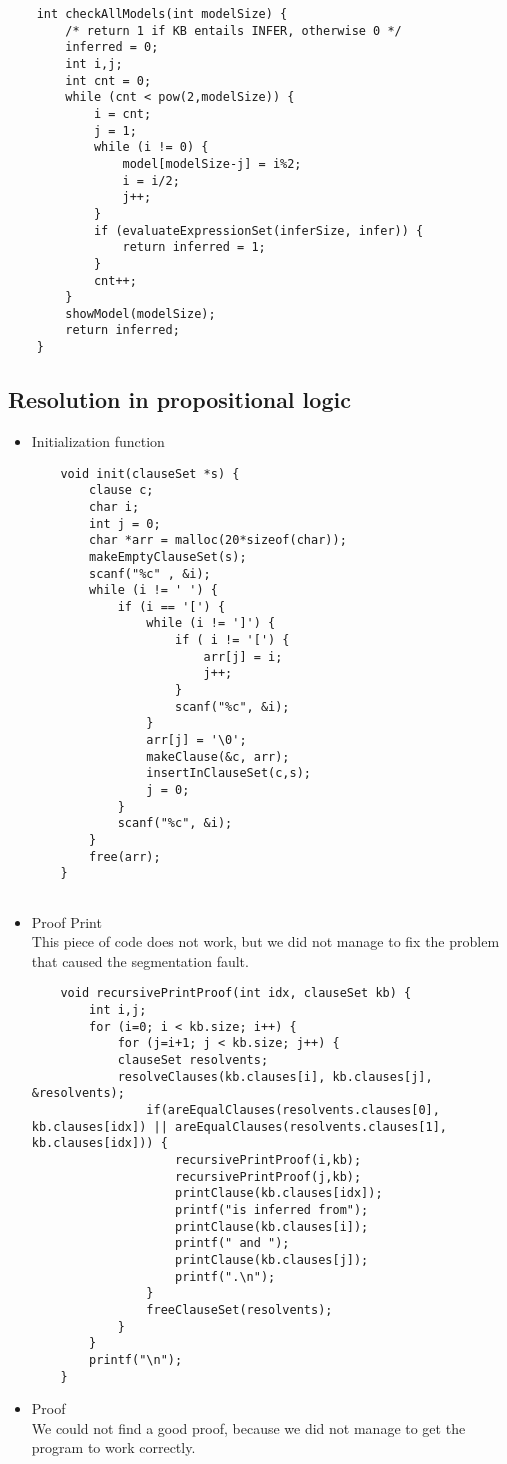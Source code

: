 \documentclass{article}
\begin{document}
	\begin{lstlisting}
	int checkAllModels(int modelSize) {
		/* return 1 if KB entails INFER, otherwise 0 */
		inferred = 0;
		int i,j;
		int cnt = 0;
		while (cnt < pow(2,modelSize)) {
			i = cnt;
			j = 1;
			while (i != 0) {
				model[modelSize-j] = i%2;
				i = i/2;
				j++;
			}
			if (evaluateExpressionSet(inferSize, infer)) {
				return inferred = 1;
			}
			cnt++;
		}
		showModel(modelSize);
		return inferred;
	}
	\end{lstlisting}
	
	
	\subsection*{Resolution in propositional logic}
	\begin{itemize}
	\item Initialization function
	\begin{lstlisting}
	void init(clauseSet *s) {
		clause c;
		char i;
		int j = 0;
		char *arr = malloc(20*sizeof(char));
		makeEmptyClauseSet(s);
		scanf("%c" , &i);
		while (i != ' ') {
			if (i == '[') {
				while (i != ']') {
					if ( i != '[') {
						arr[j] = i;
						j++;
					}
					scanf("%c", &i);
				}
				arr[j] = '\0';
				makeClause(&c, arr);
				insertInClauseSet(c,s);
				j = 0;
			}
			scanf("%c", &i);
		}
		free(arr);
	}
		
	\end{lstlisting}
	
	\item Proof Print\\
	This piece of code does not work, but we did not manage to fix the problem that caused the segmentation fault.
	\begin{lstlisting}
	void recursivePrintProof(int idx, clauseSet kb) {
		int i,j;
		for (i=0; i < kb.size; i++) {
			for (j=i+1; j < kb.size; j++) {
			clauseSet resolvents;
			resolveClauses(kb.clauses[i], kb.clauses[j], &resolvents);
				if(areEqualClauses(resolvents.clauses[0], kb.clauses[idx]) || areEqualClauses(resolvents.clauses[1], kb.clauses[idx])) {
					recursivePrintProof(i,kb);
					recursivePrintProof(j,kb);
					printClause(kb.clauses[idx]);
					printf("is inferred from");
					printClause(kb.clauses[i]);
					printf(" and ");
					printClause(kb.clauses[j]);
					printf(".\n");
				}
				freeClauseSet(resolvents);
			}
		}
		printf("\n");
	}
	\end{lstlisting}
	
	\item Proof \\
	We could not find a good proof, because we did not manage to get the program to work correctly.
	\end{itemize}
\end{document}
